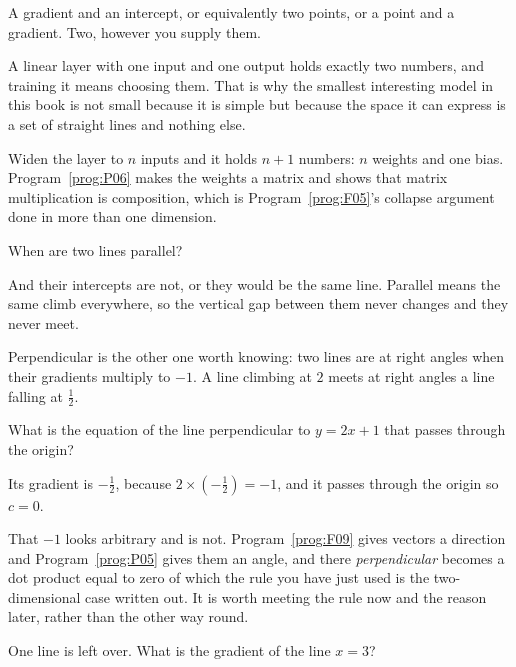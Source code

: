 \begin{fr}
A gradient and an intercept, or equivalently two points, or a point and a
gradient. Two, however you supply them.

\begin{aibox}
A linear layer with one input and one output holds exactly two numbers, and
training it means choosing them. That is why the smallest interesting model in
this book is not small because it is simple but because the space it can
express is a set of straight lines and nothing else.

Widen the layer to $n$ inputs and it holds $n + 1$ numbers: $n$ weights and
one bias. Program~\ref{prog:P06} makes the weights a matrix and shows that
matrix multiplication is composition, which is Program~\ref{prog:F05}'s
collapse argument done in more than one dimension.
\end{aibox}

When are two lines parallel?
\nextframe
\end{fr}

\begin{fr}
And their intercepts are not, or they would be the same line. Parallel means
the same climb everywhere, so the vertical gap between them never changes and
they never meet.

Perpendicular is the other one worth knowing: two lines are at right angles
when their gradients multiply to $-1$. A line climbing at $2$ meets at right
angles a line falling at $\frac{1}{2}$.

What is the equation of the line perpendicular to $y = 2x + 1$ that passes
through the origin?
\nextframe
\end{fr}

\begin{fr}
Its gradient is $-\frac{1}{2}$, because $2 \times \left(-\frac{1}{2}\right)
= -1$, and it passes through the origin so $c = 0$.

That $-1$ looks arbitrary and is not. Program~\ref{prog:F09} gives vectors a
direction and Program~\ref{prog:P05} gives them an angle, and there
\emph{perpendicular} becomes a dot product equal to zero \dash{} of which the
rule you have just used is the two-dimensional case written out. It is worth
meeting the rule now and the reason later, rather than the other way round.

One line is left over. What is the gradient of the line $x = 3$?
\nextframe
\end{fr}

